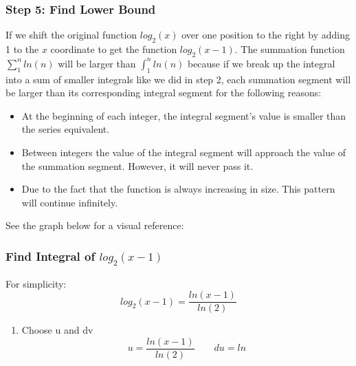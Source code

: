 \documentclass[10pt,a4paper]{article}
\theoremstyle{definition}
\begin{document}
\subsubsection{Step 5: Find Lower Bound}
If we shift the original function $log_2(x)$ over one position to the right by adding 1 to the $x$ coordinate to get the function $log_2(x-1)$. The summation function $\sum_1^n ln(n)$ will be larger than $\int_1^n ln(n)$ because if we break up the integral into a sum of smaller integrals like we did in step 2, each summation segment will be larger than its corresponding integral segment for the following reasons:
\begin{itemize}
  \item At the beginning of each integer, the integral segment's value is smaller than the series equivalent.
  \item Between integers the value of the integral segment will approach the value of the summation segment. However, it will never pass it.
  \item Due to the fact that the function is always increasing in size. This pattern will continue infinitely.
\end{itemize}
See the graph below for a visual reference:


\subsubsection{Find Integral of $log_2(x-1)$}
For simplicity:
\begin{equation*}
  log_2(x-1) = \frac{ln(x-1)}{ln(2)}
\end{equation*}

\begin{enumerate}
  \item Choose u and dv
  \begin{equation}
    u = \frac{ln(x-1)}{ln(2)} \qquad du = ln
  \end{equation}
\end{enumerate}
\end{document}
